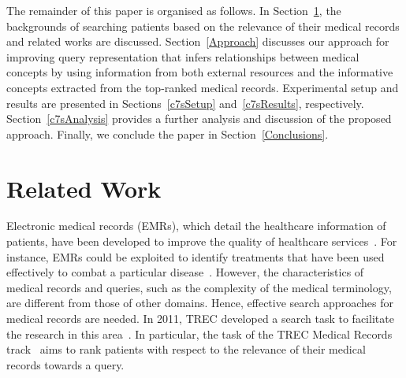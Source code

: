 \documentclass[1p]{elsarticle}
\begin{document}
 The remainder of this paper is organised as follows. In Section~\ref{RelatedWork}, the backgrounds of searching patients based on the relevance of their medical records and related works are discussed. Section~\ref{Approach} discusses our approach for improving query representation that infers relationships between medical concepts by using information from both external resources and the informative concepts extracted from the top-ranked medical records. 
Experimental setup and results are presented in Sections~\ref{c7sSetup} and~\ref{c7sResults}, respectively. Section~\ref{c7sAnalysis} provides a further analysis and discussion of the proposed approach. 
Finally, we conclude the paper in Section~\ref{Conclusions}.

\section{Related Work}\label{RelatedWork}

Electronic medical records (EMRs), which detail the healthcare information of patients, have been developed to improve the quality of healthcare services~\cite{hersh2009bio}. For instance, EMRs could be exploited to identify treatments that have been used effectively to combat a particular disease~\cite{hersh2009bio,hersh2004jama}. However, the characteristics of medical records and queries, such as the complexity of the medical terminology, are different from those of other domains. Hence, effective search approaches for medical records are needed.
In 2011, TREC developed a search task to facilitate the research in this area~\cite{voorhees2011trec}. In particular, the task of the TREC Medical Records track~\cite{voorhees2011trec,voorhees2012trec} aims to rank patients with respect to the relevance of their medical records towards a query. 
\end{document}
